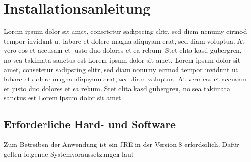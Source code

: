 
\thispagestyle{plain}

\chapter{Installationsanleitung}\label{c_installationsanleitung}
Lorem ipsum dolor sit amet, consetetur sadipscing elitr, sed diam nonumy eirmod tempor invidunt ut labore et dolore magna aliquyam erat, sed diam voluptua. At vero eos et accusam et justo duo dolores et ea rebum. Stet clita kasd gubergren, no sea takimata sanctus est Lorem ipsum dolor sit amet. Lorem ipsum dolor sit amet, consetetur sadipscing elitr, sed diam nonumy eirmod tempor invidunt ut labore et dolore magna aliquyam erat, sed diam voluptua. At vero eos et accusam et justo duo dolores et ea rebum. Stet clita kasd gubergren, no sea takimata sanctus est Lorem ipsum dolor sit amet.


\section{Erforderliche Hard- und Software}\label{s_erforderliche_hw_sw}
Zum Betreiben der Anwendung ist ein \ac{JRE} in der Version 8 erforderlich.
Dafür gelten folgende Systemvoraussetzungen laut \cite{oraclejsv}

